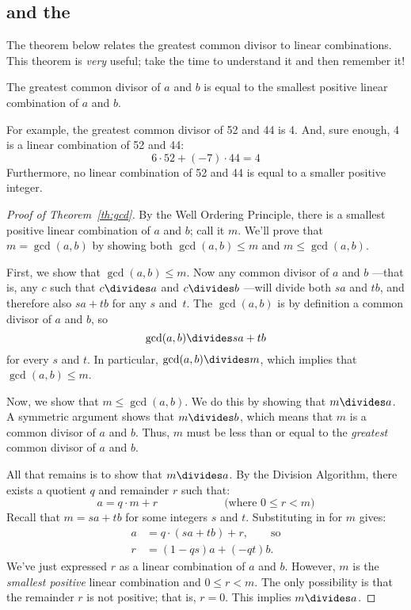 \begin{editingnotes}
\subsection{ and the }

The theorem below relates the greatest common divisor to linear combinations.  This
theorem is \emph{very} useful; take the time to understand it and then remember it!

\begin{theorem} \label{th:gcd} The greatest common divisor of $a$ and $b$ is equal to
the smallest positive linear combination of $a$ and $b$.
\end{theorem}

For example, the greatest common divisor of 52 and 44 is 4.  And, sure enough, 4 is a
linear combination of 52 and 44:
\[
6 \cdot 52 + (-7) \cdot 44 = 4
\]
Furthermore, no linear combination of 52 and 44 is equal to a smaller positive integer.

\begin{proof}[Proof of Theorem~\ref{th:gcd}] By the Well Ordering Principle, there is a
smallest positive linear combination of $a$ and $b$; call it $m$.  We'll prove that $m =
\gcd(a, b)$ by showing both $\gcd(a, b) \leq m$ and $m \leq \gcd(a, b)$.

First, we show that $\gcd(a, b) \leq m$.  Now any common divisor of $a$ and $b$ ---that
is, any $c$ such that $c \divides a$ and $c \divides b$ ---will divide both $sa$ and
$tb$, and therefore also $sa+tb$ for any $s$ and~$t$.  The $\gcd(a, b)$ is by definition
a common divisor of $a$ and $b$, so 
\begin{equation}\label{gcdabdivlin} \gcd(a, b)
\divides s a + t b
\end{equation}
for every $s$ and $t$.  In particular, $\gcd(a, b) \divides m$, which implies that $\gcd(a,
b) \leq m$.

Now, we show that $m \leq \gcd(a, b)$.  We do this by showing that $m \divides a$.  A
symmetric argument shows that $m \divides b$, which means that $m$ is a common divisor
of $a$ and $b$.  Thus, $m$ must be less than or equal to the \emph{greatest} common
divisor of $a$ and $b$.

All that remains is to show that $m \divides a$.  By the Division Algorithm, there
exists a quotient $q$ and remainder $r$ such that: 
\[
a = q \cdot m + r \hspace{1in} \text{(where $0 \leq r < m$)} \]
Recall that $m = s a + t b$ for some integers $s$ and
$t$.  Substituting in for $m$ gives:
\begin{align*} a & = q \cdot (s a + t b) + r,
\qquad \text{so} \\ r & = (1 - qs) a + (-qt) b.
\end{align*}
We've just expressed $r$ as a linear combination of $a$ and $b$.  However, $m$ is the
\emph{smallest positive} linear combination and $0 \leq r < m$.  The only possibility is
that the remainder $r$ is not positive; that is, $r = 0$.  This implies $m \divides
a$.  \end{proof}


\end{editingnotes}

